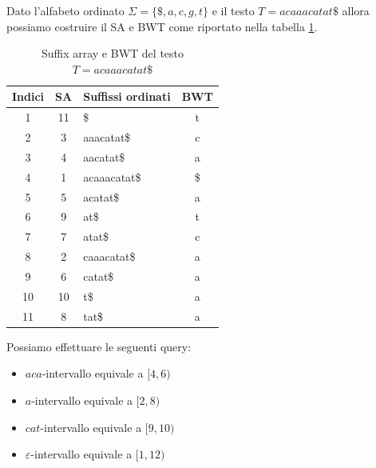 \begin{esempio} \label{esempio-bwt}
    Dato l'alfabeto ordinato $\Sigma=\{\$, a, c, g, t\}$ e il testo
    $T=acaaacatat\$$ allora possiamo costruire il SA e BWT come riportato nella
    tabella \ref{tab:esempio-BWT-SA}.
    \begin{table}[!ht]
        \centering
        \begin{tabular}{|c|c|l|c|}
            \hline
            \rowcolor[HTML]{EFEFEF}
            \textbf{Indici} & \textbf{SA} & \textbf{Suffissi ordinati} & \textbf{BWT} \\ \hline
            1               & 11          & \$                         & t            \\ \hline
            2               & 3           & aaacatat\$                 & c            \\ \hline
            3               & 4           & aacatat\$                  & a            \\ \hline
            4               & 1           & acaaacatat\$               & \$           \\ \hline
            5               & 5           & acatat\$                   & a            \\ \hline
            6               & 9           & at\$                       & t            \\ \hline
            7               & 7           & atat\$                     & c            \\ \hline
            8               & 2           & caaacatat\$                & a            \\ \hline
            9               & 6           & catat\$                    & a            \\ \hline
            10              & 10          & t\$                        & a            \\ \hline
            11              & 8           & tat\$                      & a            \\ \hline
        \end{tabular}
        \caption{Suffix array e BWT del testo $T=acaaacatat\$$}
        \label{tab:esempio-BWT-SA}
    \end{table}

    Possiamo effettuare le seguenti query:
    \begin{itemize}
        \item $aca$-intervallo equivale a $[4,6)$
        \item $a$-intervallo equivale a $[2,8)$
        \item $cat$-intervallo equivale a $[9,10)$
        \item $\varepsilon$-intervallo equivale a $[1,12)$
    \end{itemize}
\end{esempio}
